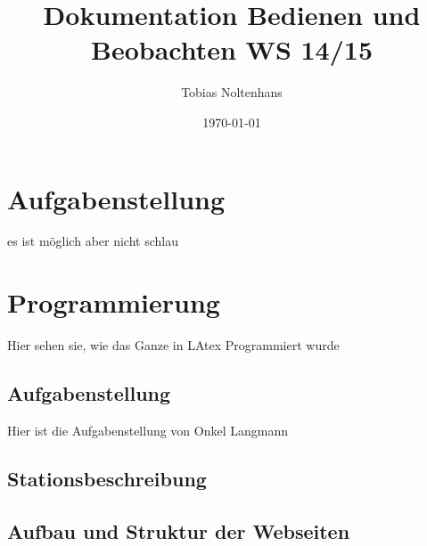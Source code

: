 \documentclass[12pt,a4paper]{book}
\author{Tobias Noltenhans}
\title{Dokumentation Bedienen und Beobachten WS 14/15}
\date{\today}
\begin{document}
\maketitle
\tableofcontents
\chapter{Aufgabenstellung}
es ist möglich aber nicht schlau
\chapter{Programmierung}
Hier sehen sie, wie das Ganze in LAtex Programmiert wurde
\section{Aufgabenstellung}
Hier ist die Aufgabenstellung von Onkel Langmann
\section{Stationsbeschreibung}
\section{Aufbau und Struktur der Webseiten}
\end{document}
